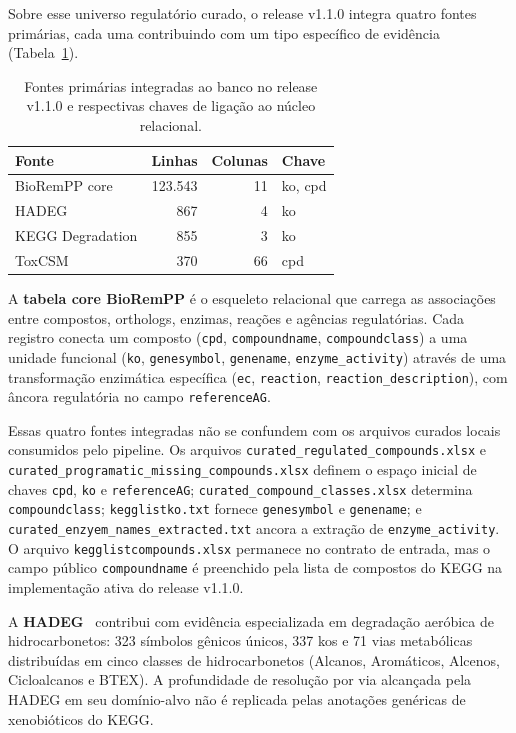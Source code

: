 Sobre esse universo regulatório curado, o release v1.1.0 integra quatro fontes primárias, cada uma contribuindo com um tipo específico de evidência (Tabela~\ref{tab:c1-fontes}).

\begin{table}[htbp]
\centering
\caption{Fontes primárias integradas ao banco \biorempp{} no release v1.1.0 e respectivas chaves de ligação ao núcleo relacional.}
\label{tab:c1-fontes}
\small
\begin{tabular}{@{}lrrl@{}}
\toprule
\textbf{Fonte} & \textbf{Linhas} & \textbf{Colunas} & \textbf{Chave} \\
\midrule
BioRemPP core        & 123.543 & 11 & \gls{ko}, \gls{cpd} \\
HADEG                &    867 &  4 & \gls{ko} \\
KEGG Degradation     &    855 &  3 & \gls{ko} \\
ToxCSM               &    370 & 66 & \gls{cpd} \\
\bottomrule
\end{tabular}
\end{table}

A \textbf{tabela core BioRemPP} é o esqueleto relacional que carrega as associações entre compostos, orthologs, enzimas, reações e agências regulatórias. Cada registro conecta um composto (\texttt{cpd}, \texttt{compoundname}, \texttt{compoundclass}) a uma unidade funcional (\texttt{ko}, \texttt{genesymbol}, \texttt{genename}, \texttt{enzyme\_activity}) através de uma transformação enzimática específica (\texttt{ec}, \texttt{reaction}, \texttt{reaction\_description}), com âncora regulatória no campo \texttt{referenceAG}.

Essas quatro fontes integradas não se confundem com os arquivos curados locais consumidos pelo pipeline. Os arquivos \texttt{curated\_regulated\_compounds.xlsx} e \texttt{curated\_programatic\_missing\_compounds.xlsx} definem o espaço inicial de chaves \texttt{cpd}, \texttt{ko} e \texttt{referenceAG}; \texttt{curated\_compound\_classes.xlsx} determina \texttt{compoundclass}; \texttt{kegglistko.txt} fornece \texttt{genesymbol} e \texttt{genename}; e \texttt{curated\_enzyem\_names\_extracted.txt} ancora a extração de \texttt{enzyme\_activity}. O arquivo \texttt{kegglistcompounds.xlsx} permanece no contrato de entrada, mas o campo público \texttt{compoundname} é preenchido pela lista de compostos do KEGG na implementação ativa do release v1.1.0.

A \textbf{HADEG}~\citep{rojas2023hadeg} contribui com evidência especializada em degradação aeróbica de hidrocarbonetos: 323 símbolos gênicos únicos, 337 \glspl{ko} e 71 vias metabólicas distribuídas em cinco classes de hidrocarbonetos (Alcanos, Aromáticos, Alcenos, Cicloalcanos e BTEX). A profundidade de resolução por via alcançada pela HADEG em seu domínio-alvo não é replicada pelas anotações genéricas de xenobióticos do KEGG.

